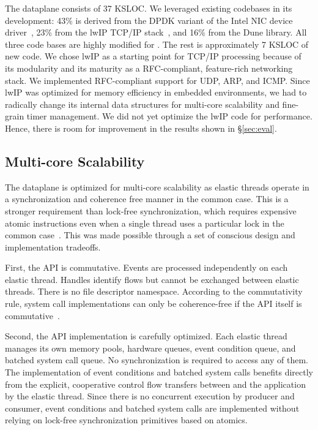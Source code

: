 The \ix dataplane consists of 37 KSLOC\@. We leveraged existing
codebases in its development: 43\% is derived from the DPDK variant of
the Intel NIC device driver~\cite{intel:dpdk}, 23\% from the lwIP
TCP/IP stack~\cite{dunkels2001design}, and 16\% from the Dune library.
All three code bases are highly modified for \ix. The rest is
approximately 7 KSLOC of new code. We chose lwIP as a starting point
for TCP/IP processing because of its modularity and its maturity as a
RFC-compliant, feature-rich networking stack. We implemented
RFC-compliant support for UDP, ARP, and ICMP.
Since lwIP was optimized for memory efficiency in embedded
environments, we had to radically change its internal data structures
for multi-core scalability and fine-grain timer management. We did not
yet optimize the lwIP code for performance. Hence, there is room for
improvement in the results shown in \S\ref{sec:eval}.


\subsection{Multi-core Scalability}
\label{sec:impl:cohfree}

The \ix dataplane is optimized for multi-core scalability as elastic
threads operate in a synchronization and coherence free manner in the
common case. This is a stronger requirement than lock-free
synchronization, which requires expensive atomic instructions even
when a single thread uses a particular lock in the common
case~\cite{DBLP:conf/sosp/DavidGT13}.  This was made possible 
through a set of conscious design and implementation tradeoffs. 

First, the \ix API is commutative. Events are processed independently
on each elastic thread. Handles identify flows but cannot be exchanged
between elastic threads. There is no file descriptor namespace.
According to the commutativity rule, system call implementations can
only be coherence-free if the API itself is
commutative~\cite{DBLP:conf/sosp/ClementsKZMK13}.

Second, the API implementation is carefully optimized.  Each elastic
thread manages its own memory pools, hardware queues, event condition
queue, and batched system call queue. No synchronization is required
to access any of them. The implementation of event conditions and
batched system calls benefits directly from the explicit, cooperative
control flow transfers between \ix and the application by the elastic
thread.  Since there is no concurrent execution by producer and
consumer, event conditions and batched system calls are implemented
without relying on lock-free synchronization primitives based
on atomics.

